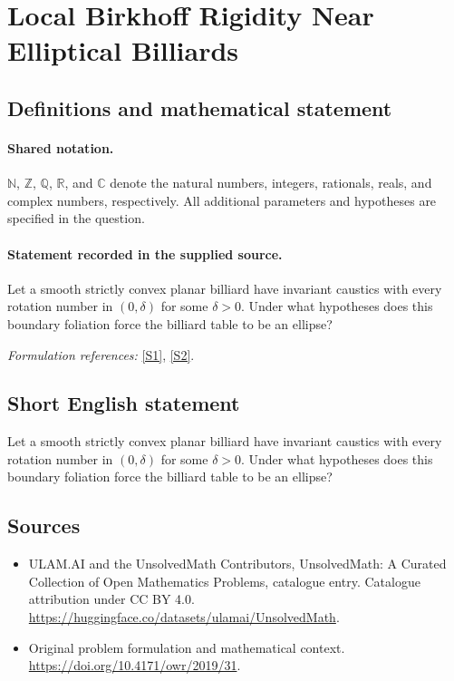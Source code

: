 \documentclass[11pt]{article}
\newcommand{\sref}[2]{\hyperlink{source:#1:#2}{[S#2]}}
\begin{document}
\section{Local Birkhoff Rigidity Near Elliptical Billiards}\label{statement}

\subsection{Definitions and mathematical statement}

\paragraph{Shared notation.}$\mathbb N$, $\mathbb Z$, $\mathbb Q$, $\mathbb R$, and $\mathbb C$ denote the natural numbers, integers, rationals, reals, and complex numbers, respectively. All additional parameters and hypotheses are specified in the question.


\paragraph{Statement recorded in the supplied source.}
Let a smooth strictly convex planar billiard have invariant caustics with every rotation number in $(0,\delta)$ for some $\delta>0$. Under what hypotheses does this boundary foliation force the billiard table to be an ellipse?
\par\smallskip\textit{Formulation references:} \sref{statement}{1}, \sref{statement}{2}.
\subsection{Short English statement}
Let a smooth strictly convex planar billiard have invariant caustics with every rotation number in $(0,\delta)$ for some $\delta>0$. Under what hypotheses does this boundary foliation force the billiard table to be an ellipse?
\subsection{Sources}
\begin{itemize}
\item[\hypertarget{source:statement:1}{S1}] ULAM.AI and the UnsolvedMath Contributors, UnsolvedMath: A Curated Collection of Open Mathematics Problems, catalogue entry. Catalogue attribution under CC BY 4.0.
\url{https://huggingface.co/datasets/ulamai/UnsolvedMath}.
\item[\hypertarget{source:statement:2}{S2}] Original problem formulation and mathematical context.
\url{https://doi.org/10.4171/owr/2019/31}.
\end{itemize}
\label{end:statement}
\end{document}
